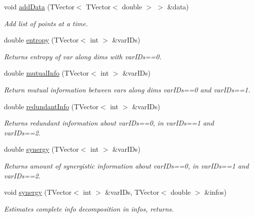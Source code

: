 \begin{DoxyCompactItemize}
void \mbox{\hyperlink{class_info_tools_a0ab715f654addd166a31b85f4235e22a}{add\+Data}} (T\+Vector$<$ T\+Vector$<$ double $>$ $>$ \&data)
\begin{DoxyCompactList}\small\item\em Add list of points at a time. \end{DoxyCompactList}\item 
double \mbox{\hyperlink{class_info_tools_a83c1cad1553e27907dbeecde00e76660}{entropy}} (T\+Vector$<$ int $>$ \&var\+I\+Ds)
\begin{DoxyCompactList}\small\item\em Returns entropy of var along dims with var\+I\+Ds==0. \end{DoxyCompactList}\item 
double \mbox{\hyperlink{class_info_tools_a1154859af94ad7d7969359ab18d24413}{mutual\+Info}} (T\+Vector$<$ int $>$ \&var\+I\+Ds)
\begin{DoxyCompactList}\small\item\em Return mutual information between vars along dims var\+I\+Ds==0 and var\+I\+Ds==1. \end{DoxyCompactList}\item 
double \mbox{\hyperlink{class_info_tools_a06c4b3cd30184da4ed588ef22e50bb40}{redundant\+Info}} (T\+Vector$<$ int $>$ \&var\+I\+Ds)
\begin{DoxyCompactList}\small\item\em Returns redundant information about var\+I\+Ds==0, in var\+I\+Ds==1 and var\+I\+Ds==2. \end{DoxyCompactList}\item 
double \mbox{\hyperlink{class_info_tools_a317eb990ee587b544e22e8c1877e8a93}{synergy}} (T\+Vector$<$ int $>$ \&var\+I\+Ds)
\begin{DoxyCompactList}\small\item\em Returns amount of synergistic information about var\+I\+Ds==0, in var\+I\+Ds==1 and var\+I\+Ds==2. \end{DoxyCompactList}\item 
void \mbox{\hyperlink{class_info_tools_aaeb993950ecbede3f66614a1bf4af845}{synergy}} (T\+Vector$<$ int $>$ \&var\+I\+Ds, T\+Vector$<$ double $>$ \&infos)
\begin{DoxyCompactList}\small\item\em Estimates complete info decomposition in infos, returns. \end{DoxyCompactList}\end{DoxyCompactItemize}


